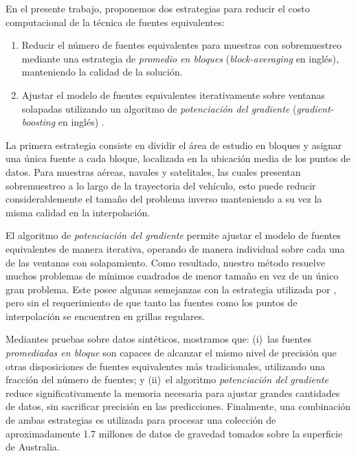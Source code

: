 En el presente trabajo, proponemos dos estrategias para reducir el costo
computacional de la técnica de fuentes equivalentes:

\begin{enumerate}
    \item Reducir el número de fuentes equivalentes para muestras con
        sobremuestreo mediante una estrategia de \emph{promedio en
        bloques} (\emph{block-averaging} en inglés), manteniendo la calidad de
        la solución.
    \item Ajustar el modelo de fuentes equivalentes iterativamente sobre
        ventanas solapadas utilizando un algoritmo de \emph{potenciación del
        gradiente} (\emph{gradient-boosting} en inglés) \citep{friedman2001}.
\end{enumerate}

La primera estrategia consiste en dividir el área de estudio en bloques
y asignar una única fuente a cada bloque, localizada en la ubicación media de
los puntos de datos.
Para muestras aéreas, navales y satelitales, las cuales presentan sobremuestreo
a lo largo de la trayectoria del vehículo, esto puede reducir considerablemente
el tamaño del problema inverso manteniendo a su vez la misma calidad en la
interpolación.

El algoritmo de \emph{potenciación del gradiente} permite ajustar el modelo de
fuentes equivalentes de manera iterativa, operando de manera individual sobre
cada una de las ventanas con solapamiento.
Como resultado, nuestro método resuelve muchos problemas de mínimos cuadrados
de menor tamaño en vez de un único gran problema.
Este posee algunas semejanzas con la estrategia utilizada por \citet{leao1989},
pero sin el requerimiento de que tanto las fuentes como los puntos de
interpolación se encuentren en grillas regulares.

Mediantes pruebas sobre datos sintéticos, mostramos que:
(i)~las fuentes \emph{promediadas en bloque} son capaces de alcanzar el mismo
nivel de precisión que otras disposiciones de fuentes equivalentes más
tradicionales, utilizando una fracción del número de fuentes; y
(ii)~el algoritmo \emph{potenciación del gradiente} reduce significativamente la
memoria necesaria para ajustar grandes cantidades de datos, sin sacrificar
precisión en las predicciones.
Finalmente, una combinación de ambas estrategias es utilizada para procesar una
colección de aproximadamente 1.7 millones de datos de gravedad tomados sobre la
superficie de Australia.



